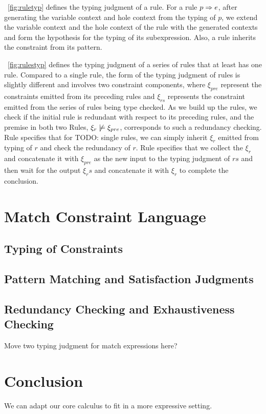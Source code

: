 \documentclass[runningheads,envcountsame,a4paper]{llncs}
\newcommand{\todo}[1]{{\color{red} TODO: #1}}
\begin{document}
 

\figurename~\ref{fig:ruletyp} defines the typing judgment of a rule. For a rule
$p \Rightarrow e$, after generating the variable context and hole context from the
typing of $p$, we extend the variable context and the hole context of the rule
with the generated contexts and form the hypothesis for the typing of its
subexpression. Also, a rule inherits the constraint from its pattern.



\figurename~\ref{fig:rulestyp} defines the typing judgment of a series of rules
that at least has one rule. Compared to a single rule, the form of the typing
judgment of rules is slightly different and involves two constraint components,
where $\xi_{pre}$ represent the constraints emitted from its preceding rules
and $\xi_{rs}$ represents the constraint emitted from the series of rules being
type checked. As we build up the rules, we check if the initial rule is
redundant with respect to its preceding rules, and the premise in both two
Rules, $\xi_r \not\models \xi_{pre}$, corresponds to such a redundancy
checking. Rule \TOneRules specifies that for \todo{single rules}, we can simply
inherit $\xi_r$ emitted from typing of $r$ and check the redundancy of $r$.
Rule \TRules specifies that we collect the $\xi_r$ and concatenate it with
$\xi_{pre}$ as the new input to the typing judgment of $rs$ and then wait for
the output $\xi_rs$ and concatenate it with $\xi_r$ to complete the conclusion.

\section{Match Constraint Language}\label{sec:constraint}
\subsection{Typing of Constraints}

\subsection{Pattern Matching and Satisfaction Judgments}

\subsection{Redundancy Checking and Exhaustiveness Checking}
Move two typing judgment for match expressions here?

\section{Conclusion}
We can adapt our core calculus to fit in a more expressive setting.
\clearpage



\end{document}
